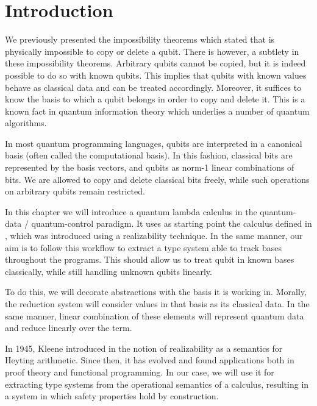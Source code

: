 \section{Introduction}

We previously presented the impossibility theorems which stated that is physically impossible to copy or delete a qubit. There is however, a subtlety in these impossibility theorems. Arbitrary qubits cannot be copied, but it is indeed possible to do so with known qubits. This implies that qubits with known values behave as classical data and can be treated accordingly. Moreover, it suffices to know the basis to which a qubit belongs in order to copy and delete it. This is a known fact in quantum information theory which underlies a number of quantum algorithms. 

In most quantum programming languages, qubits are interpreted in a canonical basis (often called the computational basis). In this fashion, classical bits are represented by the basis vectors, and qubits as norm-1 linear combinations of bits. We are allowed to copy and delete classical bits freely, while such operations on arbitrary qubits remain restricted.

In this chapter we will introduce a quantum lambda calculus in the quantum-data / quantum-control paradigm. It uses as starting point the calculus defined in \cite{DiazcaroGuillermoMiquelValironLICS19}, which was introduced using a realizability technique. In the same manner, our aim is to follow this workflow to extract a type system able to track bases throughout the programs. This should allow us to treat qubit in known bases classically, while still handling unknown qubits linearly.

To do this, we will decorate abstractions with the basis it is working in. Morally, the reduction system will consider values in that basis as its classical data. In the same manner, linear combination of these elements will represent quantum data and reduce linearly over the term.


In 1945, Kleene introduced in \cite{KleeneJSL45} the notion of realizability as a semantics for Heyting arithmetic. Since then, it has evolved and found applications both in proof theory and functional programming. In our case, we will use it for extracting type systems from the operational semantics of a calculus, resulting in a system in which safety properties hold by construction.

